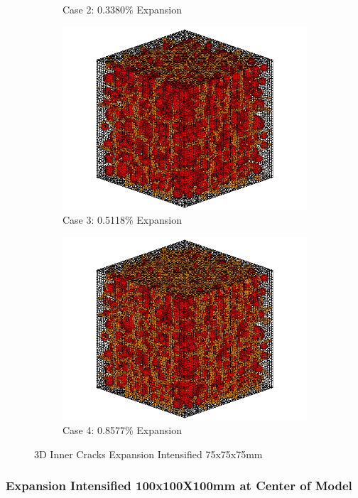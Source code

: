 \begin{figure}[!h]
\begin{subfigure}{.5\textwidth}
    \caption{Case 2: 0.3380\% Expansion}
    \end{subfigure}%
    \begin{subfigure}{.5\textwidth}
      \centering
      \includegraphics[width=.8\linewidth]{Files/exp_3D/DEF/A30X-5C_3_c.png}
    \caption{Case 3: 0.5118\% Expansion}
    \end{subfigure}
    \begin{subfigure}{.5\textwidth}
      \centering
      \includegraphics[width=.8\linewidth]{Files/exp_3D/DEF/A30X-5C_4_c.png}
    \caption{Case 4: 0.8577\% Expansion}
    \end{subfigure}%

  \caption{3D Inner Cracks Expansion Intensified 75x75x75mm}
  \label{fig:DEF_A30X-5C_3D}
\end{figure}
\subsubsection{Expansion Intensified 100x100X100mm at Center of Model}

